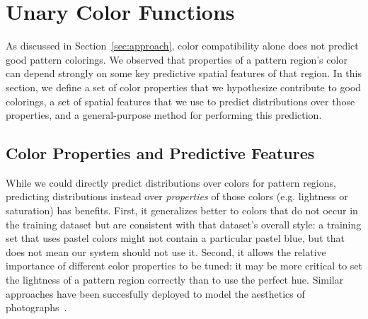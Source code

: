 \section{Unary Color Functions}
\label{sec:unary}

As discussed in Section~\ref{sec:approach}, color compatibility alone does not predict good pattern colorings. We observed that properties of a pattern region's color can depend strongly on some key predictive spatial features of that region. In this section, we define a set of color properties that we hypothesize contribute to good colorings, a set of spatial features that we use to predict distributions over those properties, and a general-purpose method for performing this prediction.

\subsection{Color Properties and Predictive Features}
\label{sec:unaryPropsAndFeatures}

While we could directly predict distributions over colors for pattern regions, predicting distributions instead over \emph{properties} of those colors (e.g. lightness or saturation) has benefits. First, it generalizes better to colors that do not occur in the training dataset but are consistent with that dataset's overall style: a training set that uses pastel colors might not contain a particular pastel blue, but that does not mean our system should not use it. Second, it allows the relative importance of different color properties to be tuned: it may be more critical to set the lightness of a pattern region correctly than to use the perfect hue. Similar approaches have been succesfully deployed to model the aesthetics of photographs~\cite{PhotoAesthetics}.

